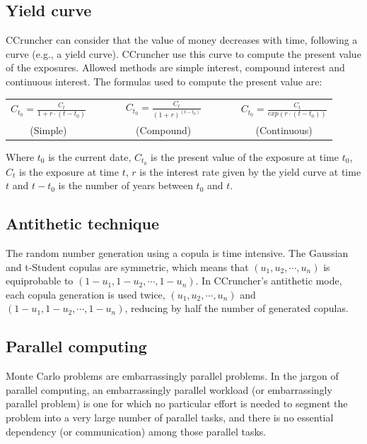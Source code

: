 \documentclass[a4paper,12pt,final]{article}
\begin{document}
\subsection{Yield curve}
CCruncher can consider that the value of money decreases with time, following a 
curve (e.g., a yield curve). CCruncher use this curve to compute the present value 
of the exposures. Allowed methods are simple interest, compound interest and
continuous interest. The formulas used to compute the present value are:

\begin{center}
\begin{tabular}{ccccc}
$C_{t_0} = \frac{C_t}{1+r \cdot (t-t_0)}$ & $\qquad$ &
$C_{t_0} = \frac{C_t}{(1+r)^{(t-t_0)}}$ & $\qquad$ &
$C_{t_0} = \frac{C_t}{exp(r \cdot (t-t_0))}$ \\
(Simple) & $\qquad$ & (Compound) & $\qquad$ & (Continuous)
\end{tabular}
\end{center}

Where $t_0$ is the current date, $C_{t_0}$ is the present value of the exposure at 
time $t_0$, $C_t$ is the exposure at time $t$, $r$ is the interest rate given by the 
yield curve at time $t$ and $t-t_0$ is the number of years between $t_0$ and $t$.

\subsection{Antithetic technique}
The random number generation using a copula is time intensive. The Gaussian and 
t-Student copulas are symmetric, which means that $(u_1, u_2, \cdots, u_n)$ is 
equiprobable to $(1-u_1, 1-u_2, \cdots, 1-u_n)$. In CCruncher's antithetic mode, 
each copula generation is used twice, $(u_1, u_2, \cdots, u_n)$ and 
$(1-u_1, 1-u_2, \cdots, 1-u_n)$, reducing by half the number of generated
copulas.

\subsection{Parallel computing}
Monte Carlo problems are embarrassingly parallel problems.
In the jargon of parallel computing, an embarrassingly parallel workload 
(or embarrassingly parallel problem) is one for which no particular effort 
is needed to segment the problem into a very large number of parallel tasks, 
and there is no essential dependency (or communication) among those parallel 
tasks.
\newline
\end{document}
